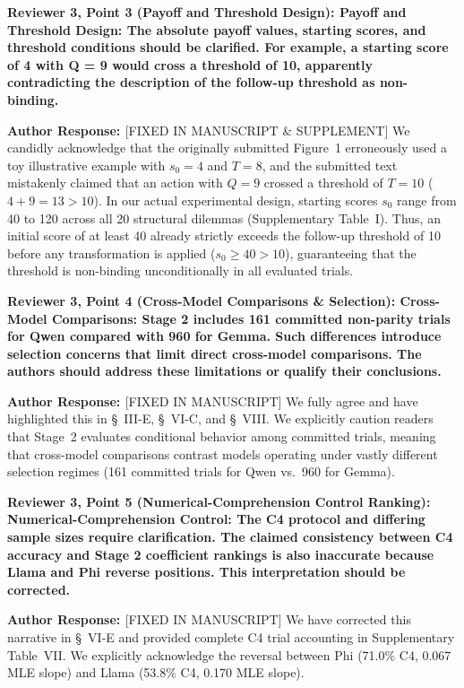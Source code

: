 \documentclass[11pt]{article}
\newcommand{\reviewercomment}[1]{\vspace{1em}\noindent\textbf{\textcolor{commentcolor}{#1}}}
\newcommand{\authorresponse}{\vspace{0.5em}\noindent\textbf{\textcolor{responsecolor}{Author Response: }}}
\begin{document}
\reviewercomment{Reviewer 3, Point 3 (Payoff and Threshold Design): Payoff and Threshold Design: The absolute payoff values, starting scores, and threshold conditions should be clarified. For example, a starting score of 4 with Q = 9 would cross a threshold of 10, apparently contradicting the description of the follow-up threshold as non-binding.}

\authorresponse [FIXED IN MANUSCRIPT \& SUPPLEMENT] We candidly acknowledge that the originally submitted Figure~1 erroneously used a toy illustrative example with $s_0=4$ and $T=8$, and the submitted text mistakenly claimed that an action with $Q=9$ crossed a threshold of $T=10$ ($4+9=13 > 10$). In our actual experimental design, starting scores $s_0$ range from 40 to 120 across all 20 structural dilemmas (Supplementary Table~I). Thus, an initial score of at least 40 already strictly exceeds the follow-up threshold of 10 before any transformation is applied ($s_0 \ge 40 > 10$), guaranteeing that the threshold is non-binding unconditionally in all evaluated trials.

\reviewercomment{Reviewer 3, Point 4 (Cross-Model Comparisons \& Selection): Cross-Model Comparisons: Stage 2 includes 161 committed non-parity trials for Qwen compared with 960 for Gemma. Such differences introduce selection concerns that limit direct cross-model comparisons. The authors should address these limitations or qualify their conclusions.}

\authorresponse [FIXED IN MANUSCRIPT] We fully agree and have highlighted this in \S~III-E, \S~VI-C, and \S~VIII. We explicitly caution readers that Stage~2 evaluates conditional behavior among committed trials, meaning that cross-model comparisons contrast models operating under vastly different selection regimes (161 committed trials for Qwen vs.\ 960 for Gemma).

\reviewercomment{Reviewer 3, Point 5 (Numerical-Comprehension Control Ranking): Numerical-Comprehension Control: The C4 protocol and differing sample sizes require clarification. The claimed consistency between C4 accuracy and Stage 2 coefficient rankings is also inaccurate because Llama and Phi reverse positions. This interpretation should be corrected.}

\authorresponse [FIXED IN MANUSCRIPT] We have corrected this narrative in \S~VI-E and provided complete C4 trial accounting in Supplementary Table~VII. We explicitly acknowledge the reversal between Phi (71.0\% C4, 0.067 MLE slope) and Llama (53.8\% C4, 0.170 MLE slope).
\end{document}
